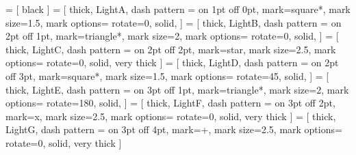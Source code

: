 \newlength{\wdtwenty}


 = [
	black
]
 = [
	thick, LightA, dash pattern = {on 1pt off 0pt},
	mark=square*, mark size=1.5, mark options={
		rotate=0,
		solid,
	}
]
 = [
	thick, LightB, dash pattern = {on 2pt off 1pt},
	mark=triangle*, mark size=2, mark options={
		rotate=0,
		solid,
	}
]
 = [
	thick, LightC, dash pattern = {on 2pt off 2pt},
	mark=star, mark size=2.5, mark options={
		rotate=0,
		solid,
		very thick
	}
]
 = [
	thick, LightD, dash pattern = {on 2pt off 3pt},
	mark=square*, mark size=1.5, mark options={
		rotate=45,
		solid,
	}
]
 = [
	thick, LightE, dash pattern = {on 3pt off 1pt},
	mark=triangle*, mark size=2, mark options={
		rotate=180,
		solid,
	}
]
 = [
	thick, LightF, dash pattern = {on 3pt off 2pt},
	mark=x, mark size=2.5, mark options={
		rotate=0,
		solid,
		very thick
	}
]
 = [
	thick, LightG, dash pattern = {on 3pt off 4pt},
	mark=+, mark size=2.5, mark options={
		rotate=0,
		solid,
		very thick
	}
]
